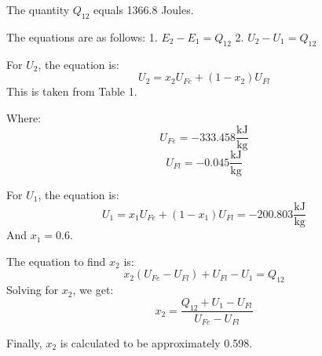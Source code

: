 The quantity \( Q_{12} \) equals 1366.8 Joules.

The equations are as follows:
1. \( E_2 - E_1 = Q_{12} \)
2. \( U_2 - U_1 = Q_{12} \)

For \( U_2 \), the equation is:
\[ U_2 = x_2 U_{Fe} + (1 - x_2) U_{Fl} \]
This is taken from Table 1.

Where:
\[ U_{Fe} = -333.458 \frac{\text{kJ}}{\text{kg}} \]
\[ U_{Fl} = -0.045 \frac{\text{kJ}}{\text{kg}} \]

For \( U_1 \), the equation is:
\[ U_1 = x_1 U_{Fe} + (1 - x_1) U_{Fl} = -200.803 \frac{\text{kJ}}{\text{kg}} \]
And \( x_1 = 0.6 \).

The equation to find \( x_2 \) is:
\[ x_2 (U_{Fe} - U_{Fl}) + U_{Fl} - U_1 = Q_{12} \]
Solving for \( x_2 \), we get:
\[ x_2 = \frac{Q_{12} + U_1 - U_{Fl}}{U_{Fe} - U_{Fl}} \]

Finally, \( x_2 \) is calculated to be approximately 0.598.